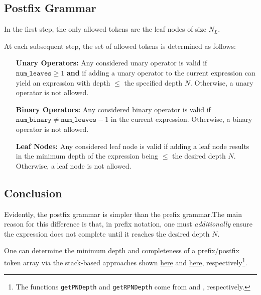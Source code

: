 \documentclass[runningheads]{llncs}
\begin{document}
\subsection{Postfix Grammar}\label{subsec:postfix_grammar}
In the first step, the only allowed tokens are the leaf nodes of size $N_L$.
\par At each subsequent step, the set of allowed tokens is determined as follows:
\begin{itemize}
\item[\textbf{Unary Operators:}]
Any considered unary operator is valid if $\texttt{num\_leaves} \geq 1$ \textbf{and} if adding a unary operator to the current expression can yield an expression with depth $\leq$ the specified depth $N$. Otherwise, a unary operator is not allowed.
\item[\textbf{Binary Operators:}]
Any considered binary operator is valid if $\texttt{num\_binary} \neq \texttt{num\_leaves} - 1$ in the current expression. Otherwise, a binary operator is not allowed.
\item[\textbf{Leaf Nodes:}]
Any considered leaf node is valid if adding a leaf node results in the minimum depth of the expression being $\leq$ the desired depth $N$. Otherwise, a leaf node is not allowed.
\end{itemize}

\subsection{Conclusion}
Evidently, the postfix grammar is simpler than the prefix grammar.The main reason for this difference is that, in prefix notation, one must \emph{additionally} ensure the expression does not complete until it reaches the desired depth $N$. \par One can determine the minimum depth and completeness of a prefix/postfix token array via the stack-based approaches shown \href{https://github.com/edfink234/Alpha-Zero-Symbolic-Regression/blob/0b5b6d0b56c2d108dda023a337edeb1084436da7/PrefixPostfixSR.cpp#L393-L485}{here} and \href{https://github.com/edfink234/Alpha-Zero-Symbolic-Regression/blob/0b5b6d0b56c2d108dda023a337edeb1084436da7/PrefixPostfixSR.cpp#L487-L641}{here}, respectively\footnote{The functions \texttt{getPNDepth} and \texttt{getRPNDepth} come from \cite{77180279} and \cite{77128902}, respectively.}.

\end{document}

